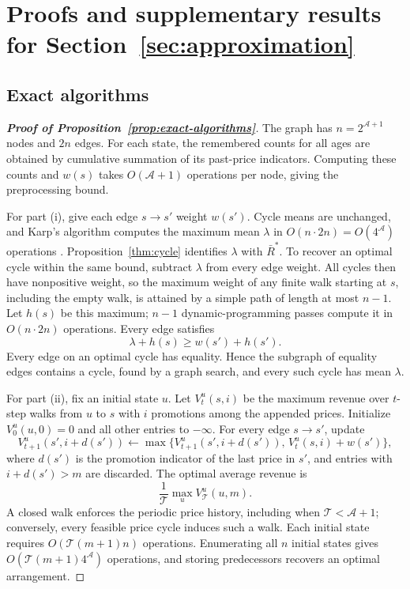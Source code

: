 

\section{Proofs and supplementary results for Section~\ref{sec:approximation}}
\label{app:approximation}

\begingroup\color{black}
\subsection{Exact algorithms}
\label{app:exact-algorithms}

\begin{proof}[\normalfont\bfseries Proof of Proposition~\ref{prop:exact-algorithms}]
The graph has \(n=2^{\mathcal A+1}\) nodes and \(2n\) edges. For each state, the remembered counts for all ages are obtained by cumulative summation of its past-price indicators. Computing these counts and \(w(s)\) takes \(O(\mathcal A+1)\) operations per node, giving the preprocessing bound.

For part (i), give each edge \(s\to s'\) weight \(w(s')\). Cycle means are unchanged, and Karp's algorithm computes the maximum mean \(\lambda\) in \(O(n\cdot2n)=O(4^{\mathcal A})\) operations \citep{karp1978}. Proposition~\ref{thm:cycle} identifies \(\lambda\) with \(\bar R^*\). To recover an optimal cycle within the same bound, subtract \(\lambda\) from every edge weight. All cycles then have nonpositive weight, so the maximum weight of any finite walk starting at \(s\), including the empty walk, is attained by a simple path of length at most \(n-1\). Let \(h(s)\) be this maximum; \(n-1\) dynamic-programming passes compute it in \(O(n\cdot2n)\) operations. Every edge satisfies
\[
 \lambda+h(s)\ge w(s')+h(s').
\]
Every edge on an optimal cycle has equality. Hence the subgraph of equality edges contains a cycle, found by a graph search, and every such cycle has mean \(\lambda\).

For part (ii), fix an initial state \(u\). Let \(V_t^u(s,i)\) be the maximum revenue over \(t\)-step walks from \(u\) to \(s\) with \(i\) promotions among the appended prices. Initialize \(V_0^u(u,0)=0\) and all other entries to \(-\infty\). For every edge \(s\to s'\), update
\[
 V_{t+1}^u(s',i+d(s'))
 \leftarrow
 \max\{V_{t+1}^u(s',i+d(s')),\,V_t^u(s,i)+w(s')\},
\]
where \(d(s')\) is the promotion indicator of the last price in \(s'\), and entries with \(i+d(s')>m\) are discarded. The optimal average revenue is
\[
 \frac1{\mathcal T}\max_u V_{\mathcal T}^u(u,m).
\]
A closed walk enforces the periodic price history, including when \(\mathcal T<\mathcal A+1\); conversely, every feasible price cycle induces such a walk. Each initial state requires \(O(\mathcal T(m+1)n)\) operations. Enumerating all \(n\) initial states gives \(O(\mathcal T(m+1)4^{\mathcal A})\) operations, and storing predecessors recovers an optimal arrangement.
\end{proof}
\par\endgroup

